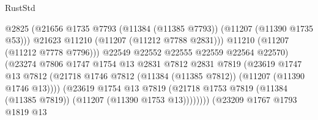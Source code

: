 \begin{lexlean}{RustStd}
\begin{coremodule}
                                              @2825
                                              (@21656
                                                @1735
                                                @7793
                                                (@11384 (@11385 @7793))
                                                (@11207 (@11390 @1735 @53)))
                                              @21623
                                              @11210
                                              (@11207 (@11212 @7788 @2831)))
                                            @11210
                                            (@11207 (@11212 @7778 @7796)))
                                          @22549
                                          @22552
                                          @22555
                                          @22559
                                          @22564
                                          @22570)
                                        (@23274
                                          @7806
                                          @1747
                                          @1754
                                          @13
                                          @2831
                                          @7812
                                          @2831
                                          @7819
                                          (@23619
                                            @1747
                                            @13
                                            @7812
                                            (@21718
                                              @1746
                                              @7812
                                              (@11384 (@11385 @7812))
                                              (@11207 (@11390 @1746 @13))))
                                          (@23619
                                            @1754
                                            @13
                                            @7819
                                            (@21718
                                              @1753
                                              @7819
                                              (@11384 (@11385 @7819))
                                              (@11207 (@11390 @1753 @13))))))))
                                  (@23209
                                    @1767
                                    @1793
                                    @1819
                                    @13

\end{coremodule}
\end{lexlean}
